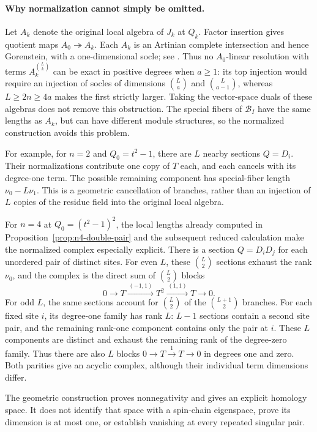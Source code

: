 \documentclass[11pt]{article}
\theoremstyle{definition}
\begin{document}
\paragraph{Why normalization cannot simply be omitted.}
Let $A_k$ denote the original local algebra of $J_k$ at $Q_k$.
Factor insertion gives quotient maps $A_0\twoheadrightarrow A_k$.
Each $A_k$ is an Artinian complete intersection and hence Gorenstein,
with a one-dimensional socle; see \cite[Section~47.21]{Stacks}.
Thus no $A_0$-linear resolution with terms
$A_k^{\binom Lk}$ can be exact in positive degrees when $a\ge1$:
its top injection would require an injection of socles of dimensions
$\binom La$ and $\binom L{a-1}$, whereas $L\ge2n\ge4a$ makes
the first strictly larger. Taking the vector-space duals of these
algebras does not remove this obstruction. The special fibers of
$\mathcal B_I$ have the same lengths as $A_k$, but can have
different module structures, so the normalized construction avoids
this problem.

For example, for $n=2$ and $Q_0=t^2-1$, there are $L$ nearby
sections $Q=D_i$. Their normalizations contribute one copy of $T$
each, and each cancels with its degree-one term. The possible
remaining component has special-fiber length
$\nu_0-L\nu_1$. This is a geometric cancellation of branches,
rather than an injection of $L$ copies of the residue field into
the original local algebra.

For $n=4$ at $Q_0=(t^2-1)^2$, the local lengths already computed
in Proposition~\ref{prop:n4-double-pair} and the subsequent reduced
calculation make the normalized complex especially explicit. There
is a section $Q=D_iD_j$ for each unordered pair of distinct sites.
For even $L$, these $\binom L2$ sections exhaust the rank $\nu_0$,
and the complex is the direct sum of $\binom L2$ blocks
\[
 0\longrightarrow T\xrightarrow{\,(-1,1)\,}T^2
       \xrightarrow{\,(1,1)\,}T\longrightarrow0.
\]
For odd $L$, the same sections account for $\binom L2$ of the
$\binom{L+1}2$ branches. For each fixed site $i$, its degree-one
family has rank $L$: $L-1$ sections contain a second site pair,
and the remaining rank-one component contains only the pair at $i$.
These $L$ components are distinct and exhaust the remaining rank
of the degree-zero family. Thus there are also $L$ blocks
$0\to T\xrightarrow{1}T\to0$ in degrees one and zero. Both
parities give an acyclic complex, although their individual term
dimensions differ.

The geometric construction proves nonnegativity and gives an explicit
homology space. It does not identify that space with a spin-chain
eigenspace, prove its dimension is at most one, or establish vanishing
at every repeated singular pair.
\end{document}
